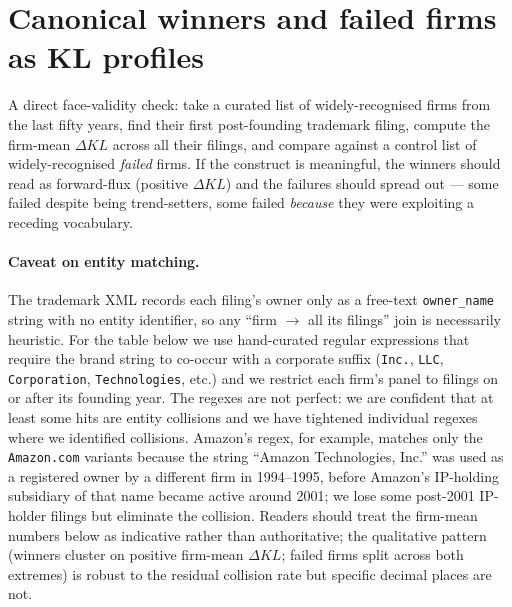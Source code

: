 \documentclass[11pt]{article}
\begin{document}
\section{Canonical winners and failed firms as KL profiles}
\label{sec:canonical-winners}

A direct face-validity check: take a curated list of widely-recognised
firms from the last fifty years, find their first post-founding
trademark filing, compute the firm-mean $\Delta KL$ across all their
filings, and compare against a control list of widely-recognised
\emph{failed} firms. If the construct is meaningful, the winners should
read as forward-flux (positive $\Delta KL$) and the failures should
spread out --- some failed despite being trend-setters, some failed
\emph{because} they were exploiting a receding vocabulary.

\paragraph{Caveat on entity matching.}
The trademark XML records each filing's owner only as a free-text
\texttt{owner\_name} string with no entity identifier, so any
``firm $\to$ all its filings'' join is necessarily heuristic. For the
table below we use hand-curated regular expressions that require the
brand string to co-occur with a corporate suffix (\texttt{Inc.},
\texttt{LLC}, \texttt{Corporation}, \texttt{Technologies}, etc.) and we
restrict each firm's panel to filings on or after its founding year.
The regexes are not perfect: we are confident that at least some hits
are entity collisions and we have tightened individual regexes where we
identified collisions. Amazon's regex, for example, matches only the
\texttt{Amazon.com} variants because the string ``Amazon Technologies,
Inc.'' was used as a registered owner by a different firm in
1994--1995, before Amazon's IP-holding subsidiary of that name became
active around 2001; we lose some post-2001 IP-holder filings but
eliminate the collision. Readers should treat the firm-mean numbers
below as indicative rather than authoritative; the qualitative pattern
(winners cluster on positive firm-mean $\Delta KL$; failed firms split
across both extremes) is robust to the residual collision rate but
specific decimal places are not.

\begin{table}[h]
\centering
\caption{Firm-mean and first-real-filing KL profile for 41 canonical
``winner'' firms and the 17 widely-recognised failed firms with
sufficient post-founding clean-panel data. Filings filtered to
filing-date $\geq$ founding-year; see entity-matching caveat above.
Corpus median pros $=4.85$, retr $=4.84$.}
\label{tab:big-firm-kl}
\tiny

\end{table}
\end{document}
